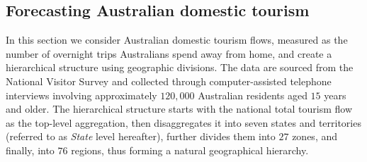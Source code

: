 \documentclass[11pt,a4paper,]{article}
\begin{document}
\hypertarget{tbl-labour-info}{}
\begin{table}[!h]
\caption{\label{tbl-labour-info}Number of time series selected using different proposed methods and the
optimal parameter values identified in the labour application,
considering a single test set (from August 2022 to July 2023). }\tabularnewline

\centering
{}
\end{table}

\hypertarget{sec-tourism}{%
\subsection{Forecasting Australian domestic tourism}\label{sec-tourism}}

In this section we consider Australian domestic tourism flows, measured
as the number of overnight trips Australians spend away from home, and
create a hierarchical structure using geographic divisions. The data are
sourced from the National Visitor Survey and collected through
computer-assisted telephone interviews involving approximately
\(120,000\) Australian residents aged \(15\) years and older. The
hierarchical structure starts with the national total tourism flow as
the top-level aggregation, then disaggregates it into seven states and
territories (referred to as \emph{State} level hereafter), further
divides them into \(27\) zones, and finally, into \(76\) regions, thus
forming a natural geographical hierarchy.
\end{document}
